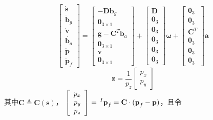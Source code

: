 \documentclass{article}
\begin{document}
\begin{equation}
    \left[\begin{array}{c}
        \dot{\textbf{s}}\\\dot{\textbf{b}}_{g}\\\dot{\textbf{v}}\\
        \dot{\textbf{b}_{a}}\\\dot{\textbf{p}}\\\dot{\textbf{p}}_{f}
    \end{array}\right]
    =\left[\begin{array}{c}
        -\textbf{D}\textbf{b}_{g}\\\textbf{0}_{3\times 1}\\\textbf{g}-\textbf{C}^{T}\textbf{b}_{a}\\
        \textbf{0}_{3\times 1}\\\textbf{v}\\\textbf{0}_{3\times 1}
    \end{array}\right]
    +\left[\begin{array}{c}
        \textbf{D}\\\textbf{0}_{3}\\\textbf{0}_{3}\\\textbf{0}_{3}\\\textbf{0}_{3}\\\textbf{0}_{3}
    \end{array}\right]\mathbf{\omega}
    +\left[\begin{array}{c}
        \textbf{0}_{3}\\\textbf{0}_{3}\\\textbf{C}^{T}\\\textbf{0}_{3}\\\textbf{0}_{3}\\\textbf{0}_{3}
    \end{array}\right]\textbf{a}
\end{equation}
\begin{equation}
    \textbf{z}=\frac{1}{p_z}\left[\begin{array}{c} p_x\\p_y \end{array}\right]
\end{equation}
其中$\textbf{C}\triangleq\textbf{C}(\textbf{s})$，
$\left[\begin{array}{c} p_x\\p_y\\p_z \end{array}\right]=\sideset{^I}{}{\mathop{\textbf{p}_{f}}}
    =\textbf{C}\cdot(\textbf{p}_{f}-\textbf{p})$，且令
\end{document}
